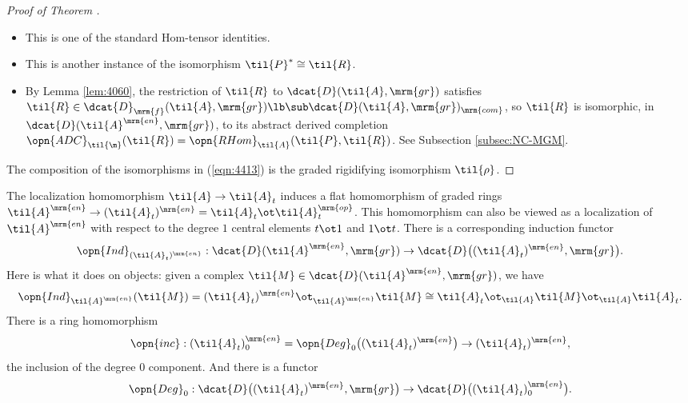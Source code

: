 \begin{proof}[Proof of Theorem \tup{\ref{thm:4400}}]
\begin{itemize}
\item[$\cong^{4}$~:] This is one of the standard Hom-tensor identities. 

\item[$\cong^{5}$~:] This is another instance of the isomorphism 
$\til{P}^* \cong \til{R}$. 

\item[$\cong^{6}$~:] By Lemma \ref{lem:4060}, the restriction of 
$\til{R}$ to $\dcat{D}(\til{A}, \mrm{gr})$ satisfies  
$\til{R} \in \dcat{D}_{\mrm{f}}(\til{A}, \mrm{gr}) \lb 
\sub \dcat{D}(\til{A}, \mrm{gr})_{\mrm{com}}$,
so $\til{R}$ is isomorphic, in $\dcat{D}(\til{A}^{\mrm{en}}, \mrm{gr})$,
to its abstract derived completion 
$\opn{ADC}_{\til{\m}}(\til{R}) = \opn{RHom}_{\til{A}} (\til{P}, \til{R})$.
See Subsection \ref{subsec:NC-MGM}. 
\end{itemize}

The composition of the isomorphisms in (\ref{eqn:4413}) is the graded 
rigidifying isomorphism $\til{\rho}$. 
\end{proof}

The localization homomorphism $\til{A} \to \til{A}_t$
induces a flat homomorphism of graded rings  
$\til{A}^{\mrm{en}} \to (\til{A}_t)^{\mrm{en}} =
\til{A}_t \ot \til{A}_t^{\mrm{op}}$.
This homomorphism can also be viewed as a localization of 
$\til{A}^{\mrm{en}}$ with respect to the degree $1$ central elements 
$t \ot 1$ and $1 \ot t$. 
There is a corresponding induction functor 
\begin{equation} \label{eqn:4420}
\opn{Ind}_{(\til{A}_t)^{\mrm{en}}}
: \dcat{D}(\til{A}^{\mrm{en}}, \mrm{gr}) \to 
\dcat{D} \bigl( (\til{A}_t)^{\mrm{en}}, \mrm{gr} \bigr) .
\end{equation}
Here is what it does on objects: given a complex 
$\til{M} \in \dcat{D}(\til{A}^{\mrm{en}}, \mrm{gr})$,
we have 
\[ \opn{Ind}_{\til{A}^{\mrm{en}}}(\til{M}) = 
(\til{A}_t)^{\mrm{en}} \ot_{\til{A}^{\mrm{en}}} \til{M} \cong 
\til{A}_t \ot_{\til{A}} \til{M} \ot_{\til{A}} \til{A}_t . \]
There is a ring homomorphism  
\[ \opn{inc} : (\til{A}_t)^{\mrm{en}}_0 = 
\opn{Deg}_0 \bigl( (\til{A}_t)^{\mrm{en}} \bigr)
\to (\til{A}_t)^{\mrm{en}} , \]
the inclusion of the degree $0$ component. And there is a functor 
\begin{equation} \label{eqn:4421}
\opn{Deg}_0 : \dcat{D} \bigl( (\til{A}_t)^{\mrm{en}}, \mrm{gr} \bigr) \to 
\dcat{D} \bigl( (\til{A}_t)^{\mrm{en}}_0 \bigr) . 
\end{equation}

